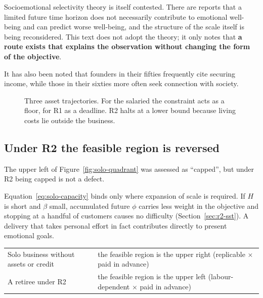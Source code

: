 \begin{remark}
Socioemotional selectivity theory is itself contested. There are reports that a limited
future time horizon does not necessarily contribute to emotional well-being and can predict
worse well-being, and the structure of the scale itself is being reconsidered.
This text does not adopt the theory; it only notes that
\textbf{a route exists that explains the observation without changing the form of the
objective}.
\end{remark}
It has also been noted that founders in their fifties frequently cite securing income, while
those in their sixties more often seek connection with society.

\begin{figure}[htbp]
\centering
{}
\caption{Three asset trajectories. For the salaried the constraint acts as a floor, for R1 as a deadline. R2 halts at a lower bound because living costs lie outside the business.}
\label{fig:trajectory}
\end{figure}

\subsection{Under R2 the feasible region is reversed}

The upper left of Figure~\ref{fig:solo-quadrant} was assessed as ``capped'', but under R2
being capped is not a defect.

Equation~\eqref{eq:solo-capacity} binds only where expansion of scale is required. If $H$ is
short and $\beta$ small, accumulated future $\phi$ carries less weight in the objective and
stopping at a handful of customers causes no difficulty (Section~\ref{sec:r2-sst}). A
delivery that takes personal effort in fact contributes directly to present emotional goals.

\begin{center}
\begin{tabularx}{\textwidth}{@{}lX@{}}
\toprule
Solo business without assets or credit & the feasible region is the upper right (replicable $\times$ paid in advance) \\
A retiree under R2 & the feasible region is the upper left (labour-dependent $\times$ paid in advance) \\
\bottomrule
\end{tabularx}
\label{tab:solo-quadrant-comparison}
\end{center}

